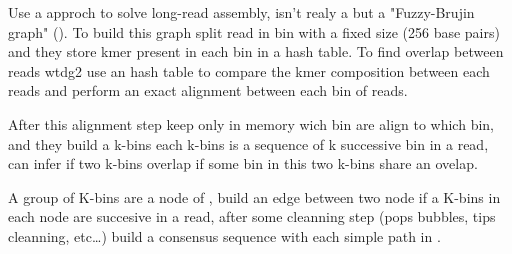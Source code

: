 \documentclass[main]{subfiles}
\begin{document}
Use a \DBG approch to solve long-read assembly, isn't realy a \DBG but a "Fuzzy-Brujin graph" (). To build this graph \wtdbg split read in bin with a fixed size (256 base pairs) and they store kmer present in each bin in a hash table.
To find overlap between reads wtdg2 use an hash table to compare the kmer composition between each reads and perform an exact alignment between each bin of reads. 

After this alignment step \wtdbg keep only in memory wich bin are align to which bin, and they build a k-bins each k-bins is a sequence of k successive bin in a read, \wtdbg can infer if two k-bins overlap if some bin in this two k-bins share an ovelap.

A group of K-bins are a node of , \wtdbg build an edge between two node if a K-bins in each node are succesive in a read, after some cleanning step (pops bubbles, tips cleanning, etc…) \wtdbg build a consensus sequence with each simple path in .

\end{document}
